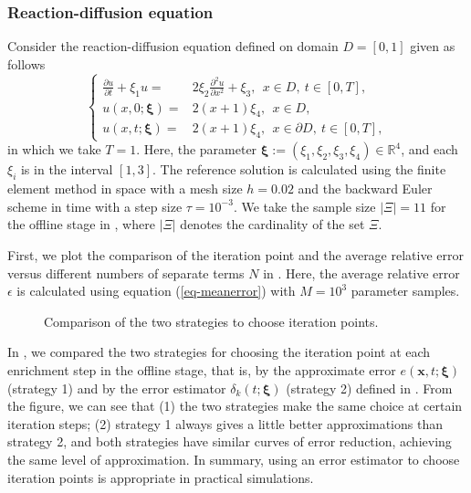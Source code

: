 \documentclass[10pt,a4paper]{article}
\numberwithin{equation}{section}
\numberwithin{lemma}{section}
\numberwithin{example}{section}
\numberwithin{definition}{section}
\numberwithin{assumption}{section}
\numberwithin{theorem}{section}
\numberwithin{proposition}{section}
\numberwithin{corollary}{section}
\numberwithin{remark}{section}
\def\[{\begin{equation}}
\begin{document}
\subsubsection{Reaction-diffusion equation}
Consider the reaction-diffusion equation defined on domain $D=[0,1]$ given as follows
$$
\left\{
    \begin{aligned}
\frac{\partial u}{\partial t}+\xi_1u=&2\xi_2 \frac{\partial^2 u}{\partial {x}^2}+\xi_3, ~~ {x}\in D,~t\in[0,T],\\[.5mm]
u({x},0;\bm{\xi})=&2({x}+1)\xi_4, ~~ {x}\in D,\\[.5mm]
 u({x},t;\bm{\xi})=&2({x}+1)\xi_4,~~ {x}\in \partial D, ~t\in[0,T],
 \end{aligned}
 \right.
$$
in which we take $T=1$. 
Here, the parameter $\bm{\xi}:=({\xi}_1,{\xi}_2,{\xi}_{3},\xi_4)\in\mathbb{R}^{4} $, and each ${\xi}_i$ is in the interval $[1,3]$.
The reference solution is calculated using the finite element method in space with a mesh size $h=0.02$ and the backward Euler scheme in time with a step size $\tau=10^{-3}$. 
We take the sample size $|\Xi|=11$ for the offline stage in , where $|\Xi|$ denotes the cardinality of the set $\Xi$.
  


First, we plot the comparison of the iteration point and the average relative error versus different numbers of separate terms $N$ in . 
Here, the average relative error $\epsilon$ is calculated using equation (\ref{eq-meanerror}) with $M=10^3$ parameter samples. 

\begin{figure}[htbp]
    \centering
    \caption{Comparison of the two strategies to choose iteration points.}
    \label{fig-rd.1}
\end{figure}
In , we compared the two strategies for choosing the iteration point at each enrichment step in the offline stage, that is, by the approximate error $e(\bm{x},t;\bm{\xi})$ (strategy 1) and by the error estimator $\delta_k(t;\bm{\xi})$ (strategy 2) defined in . 
From the figure, we can see that (1) the two strategies make the same choice at certain iteration steps; 
(2) strategy 1 always gives a little better approximations than strategy 2, and both strategies have similar curves of error reduction, achieving the same level of approximation.  
In summary, using an error estimator to choose iteration points is appropriate in practical simulations. 
\end{document}

